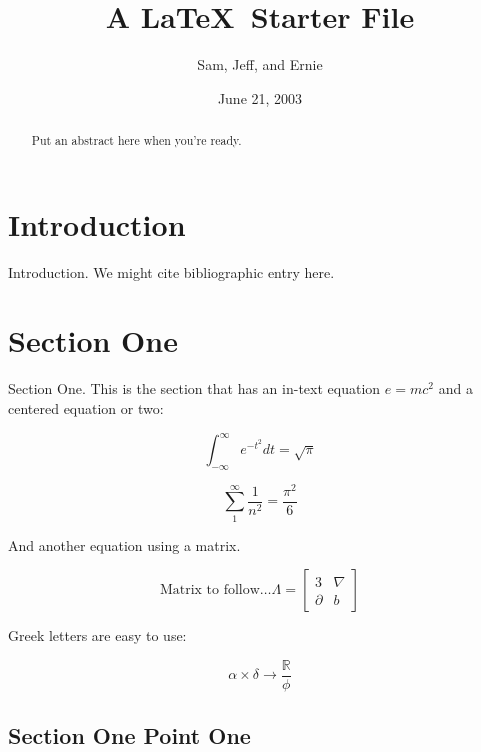 \documentclass{amsart}
\title{A \LaTeX\ Starter File}
\author{Sam, Jeff, and Ernie}
\date{June 21, 2003}
\theoremstyle{definition} %
\begin{document}
\begin{abstract}
 Put an abstract here when you're ready.
\end{abstract}

\maketitle

\tableofcontents

\section{Introduction}

Introduction.  We might cite bibliographic entry \cite{SJE} here.

\section{Section One}

Section One.  This is the section that has an in-text equation
\(e=mc^2\) and a centered equation or two:

\begin{equation}
 \int_{-\infty}^\infty e^{-t^2}dt = \sqrt{\pi}
\end{equation}

\begin{equation*} %
 \sum_1^\infty \frac{1}{n^2} = \frac{\pi^2}{6}
\end{equation*}

And another equation using a matrix.

\begin{equation}
 \textrm{Matrix to follow\ldots }
 \Lambda =
 \begin{bmatrix}
   3        &  \nabla \\
   \partial &  b
 \end{bmatrix}
\end{equation}

Greek letters are easy to use:

\begin{equation}
 \alpha \times \delta \rightarrow \frac{\mathbb R}{\phi}
\end{equation}

\subsection{Section One Point One}
\end{document}
